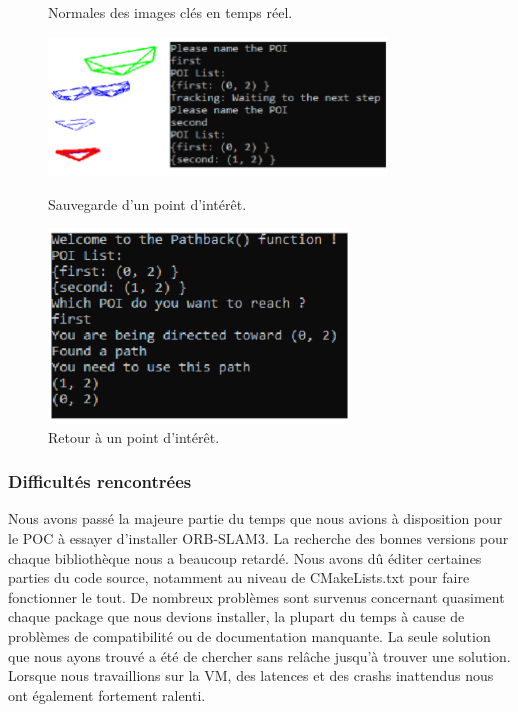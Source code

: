 \documentclass[11pt]{article}
\begin{document}
\begin{figure}[tbp]
\begin{minipage}[t]{0.4\textwidth}
            \caption{Normales des images clés en temps réel.}
            \label{fig:Test2}
          \end{minipage}
        \end{figure}

        \begin{figure}[tbp]
          \centering
          \begin{minipage}[t]{0.4\textwidth}            
            \includegraphics[width=90mm]{Test3.png}    
            \caption{Sauvegarde d'un point d'intérêt.}
            \label{fig:Test3}
          \end{minipage}
          \hfill 
          \begin{minipage}[t]{0.4\textwidth}            
            \includegraphics[width=80mm]{Test4.png}    
            \caption{Retour à un point d'intérêt.}
            \label{fig:Test4}
          \end{minipage}
        \end{figure}     
        
      \pagebreak

      \subsubsection{Difficultés rencontrées}
        Nous avons passé la majeure partie du temps que nous avions à disposition pour le POC à essayer d'installer ORB-SLAM3. 
        La recherche des bonnes
        versions pour chaque bibliothèque nous a beaucoup retardé. Nous avons dû éditer certaines parties du code source, 
        notamment au niveau de CMakeLists.txt pour faire fonctionner le tout.
        De nombreux problèmes sont survenus concernant quasiment chaque package que nous devions installer, la plupart du temps à cause de
        problèmes de compatibilité ou de documentation manquante. La seule solution que nous ayons trouvé a été de chercher sans relâche jusqu'à
        trouver une solution.
        Lorsque nous travaillions sur la VM, des latences et des crashs inattendus nous ont également fortement ralenti.       
 
\end{document}

